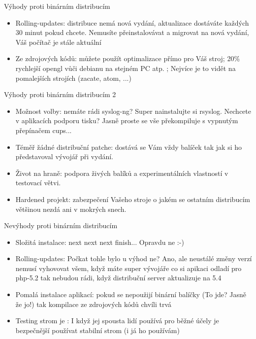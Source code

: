 \documentclass{beamer}
\begin{document}
\begin{frame}{Výhody proti binárním distribucím}
	\begin{itemize}
		\item Rolling-updates: distribuce nemá nová vydání, aktualizace dostáváte každých 30 minut pokud chcete. Nemusíte přeinstalovávat a migrovat na nová vydání, Váš počítač je stále aktuální
		\item Ze zdrojových kódů: můžete použít optimalizace přímo pro Váš stroj; 20\% rychlejší opengl vůči debianu na stejném PC atp. ; Nejvíce je to vidět na pomalejších strojích (zacate, atom, ...)
	\end{itemize}
\end{frame}
\begin{frame}{Výhody proti binárním distribucím 2}
	\begin{itemize}
		\item Možnost volby: nemáte rádi syslog-ng? Super nainstalujte si rsyslog. Nechcete v aplikacích podporu tisku? Jasně proste se vše překompiluje s vypnutým přepínačem cups...
		\item Téměř žádné distribuční patche: dostává se Vám vždy balíček tak jak si ho představoval vývojář při vydání.
		\item Život na hraně: podpora živých balíků a experimentálních vlastností v testovací větvi.
		\item Hardened projekt: zabezpečení Vašeho stroje o jakém se ostatním distribucím většinou nezdá ani v mokrých snech.
	\end{itemize}
\end{frame}

\begin{frame}{Nevýhody proti binárním distribucím}
	\begin{itemize}
		\item Složitá instalace: next next next finish... Opravdu ne :-)
		\item Rolling-updates: Počkat tohle bylo u výhod ne? Ano, ale neustálé změny verzí nemusí vyhovovat všem, když máte super vývojáře co si apikaci odladí pro php-5.2 tak nebudou rádi, když distribuční server aktualizuje na 5.4
		\item Pomalá instalace aplikací: pokud se nepoužijí binární balíčky (To jde? Jasně že jo!) tak kompilace ze zdrojových kódů chvíli trvá
		\item Testing strom je : I když jej spousta lidí používá pro běžné účely je bezpečnější používat stabilní strom (i já ho používám)
	\end{itemize}
\end{frame}
\end{document}
